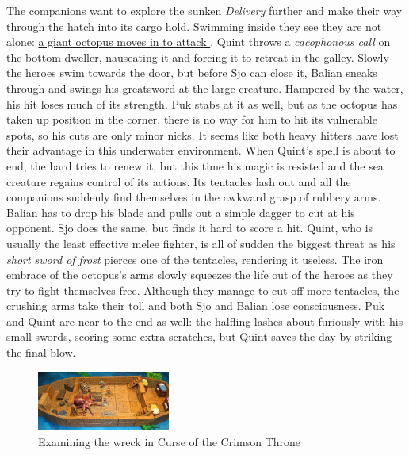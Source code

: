The companions want to explore the sunken {\itshape Delivery} further and make their way through the hatch into its cargo hold. Swimming inside they see they are not alone: \hyperref[fig:Examining-the-wreck-in-Curse-of-the-Crimson-Throne-504554608]{ a giant octopus moves in to attack } . Quint throws a  {\itshape cacophonous call} on the bottom dweller, nauseating it and forcing it to retreat in the galley. Slowly the heroes swim towards the door, but before Sjo can close it, Balian sneaks through and swings his greatsword at the large creature. Hampered by the water, his hit loses much of its strength. Puk stabs at it as well, but as the octopus has taken up position in the corner, there is no way for him to hit its vulnerable spots, so his cuts are only minor nicks. It seems like both heavy hitters have lost their advantage in this underwater environment. When Quint's spell is about to end, the bard tries to renew it, but this time his magic is resisted and the sea creature regains control of its actions. Its tentacles lash out and all the companions suddenly find themselves in the awkward grasp of rubbery arms. Balian has to drop his blade and pulls out a simple dagger to cut at his opponent. Sjo does the same, but finds it hard to score a hit. Quint, who is usually the least effective melee fighter, is all of sudden the biggest threat as his  {\itshape short sword of frost} pierces one of the tentacles, rendering it useless. The iron embrace of the octopus's arms slowly squeezes the life out of the heroes as they try to fight themselves free. Although they manage to cut off more tentacles, the crushing arms take their toll and both Sjo and Balian lose consciousness. Puk and Quint are near to the end as well: the halfling lashes about furiously with his small swords, scoring some extra scratches, but Quint saves the day by striking the final blow. \\

\begin{figure}[h]
	\centering
	\includegraphics[width=0.39\textwidth]{images/Examining-the-wreck-in-Curse-of-the-Crimson-Throne-504554608.jpg}
	\caption{Examining the wreck in Curse of the Crimson Throne}
	\label{fig:Examining-the-wreck-in-Curse-of-the-Crimson-Throne-504554608}
\end{figure}

